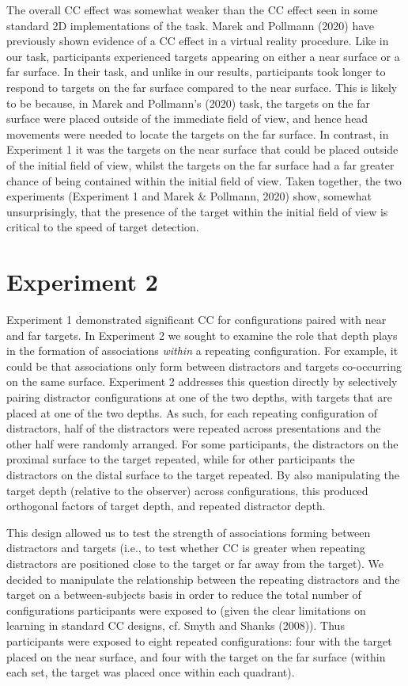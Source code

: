 \documentclass[
  english,
  man,floatsintext]{apa7}
\begin{document}
The overall CC effect was somewhat weaker than the CC effect seen in some standard 2D implementations of the task. Marek and Pollmann (2020) have previously shown evidence of a CC effect in a virtual reality procedure. Like in our task, participants experienced targets appearing on either a near surface or a far surface. In their task, and unlike in our results, participants took longer to respond to targets on the far surface compared to the near surface. This is likely to be because, in Marek and Pollmann's (2020) task, the targets on the far surface were placed outside of the immediate field of view, and hence head movements were needed to locate the targets on the far surface. In contrast, in Experiment 1 it was the targets on the near surface that could be placed outside of the initial field of view, whilst the targets on the far surface had a far greater chance of being contained within the initial field of view. Taken together, the two experiments (Experiment 1 and Marek \& Pollmann, 2020) show, somewhat unsurprisingly, that the presence of the target within the initial field of view is critical to the speed of target detection.

\hypertarget{experiment-2}{%
\section{Experiment 2}\label{experiment-2}}

Experiment 1 demonstrated significant CC for configurations paired with near and far targets. In Experiment 2 we sought to examine the role that depth plays in the formation of associations \emph{within} a repeating configuration. For example, it could be that associations only form between distractors and targets co-occurring on the same surface. Experiment 2 addresses this question directly by selectively pairing distractor configurations at one of the two depths, with targets that are placed at one of the two depths. As such, for each repeating configuration of distractors, half of the distractors were repeated across presentations and the other half were randomly arranged. For some participants, the distractors on the proximal surface to the target repeated, while for other participants the distractors on the distal surface to the target repeated. By also manipulating the target depth (relative to the observer) across configurations, this produced orthogonal factors of target depth, and repeated distractor depth.

This design allowed us to test the strength of associations forming between distractors and targets (i.e., to test whether CC is greater when repeating distractors are positioned close to the target or far away from the target). We decided to manipulate the relationship between the repeating distractors and the target on a between-subjects basis in order to reduce the total number of configurations participants were exposed to (given the clear limitations on learning in standard CC designs, cf. Smyth and Shanks (2008)). Thus participants were exposed to eight repeated configurations: four with the target placed on the near surface, and four with the target on the far surface (within each set, the target was placed once within each quadrant).
\end{document}
